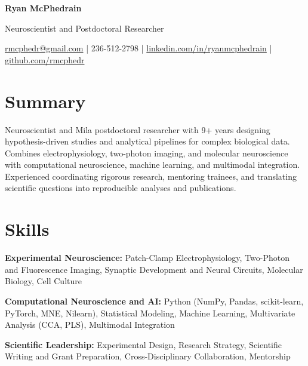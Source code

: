 \documentclass[letterpaper,10pt]{article}
\begin{document}
\begin{center}
{\LARGE\textbf{Ryan McPhedrain}}\par\vspace{4pt}
{\normalsize Neuroscientist and Postdoctoral Researcher}\par\vspace{3pt}
\small
\href{mailto:rmcphedr@gmail.com}{rmcphedr@gmail.com} | 236-512-2798 | \href{https://linkedin.com/in/ryanmcphedrain}{linkedin.com/in/ryanmcphedrain} | \href{https://github.com/rmcphedr}{github.com/rmcphedr}
\end{center}

\section{Summary}
Neuroscientist and Mila postdoctoral researcher with 9+ years designing hypothesis-driven studies and analytical pipelines for complex biological data. Combines electrophysiology, two-photon imaging, and molecular neuroscience with computational neuroscience, machine learning, and multimodal integration. Experienced coordinating rigorous research, mentoring trainees, and translating scientific questions into reproducible analyses and publications.

\section{Skills}
\textbf{Experimental Neuroscience:} Patch-Clamp Electrophysiology, Two-Photon and Fluorescence Imaging, Synaptic Development and Neural Circuits, Molecular Biology, Cell Culture\par\vspace{2pt}
\textbf{Computational Neuroscience and AI:} Python (NumPy, Pandas, scikit-learn, PyTorch, MNE, Nilearn), Statistical Modeling, Machine Learning, Multivariate Analysis (CCA, PLS), Multimodal Integration\par\vspace{2pt}
\textbf{Scientific Leadership:} Experimental Design, Research Strategy, Scientific Writing and Grant Preparation, Cross-Disciplinary Collaboration, Mentorship
\end{document}

